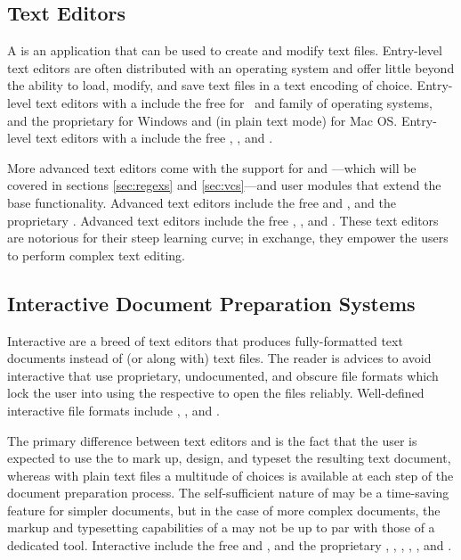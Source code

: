 \subsection{Text Editors}
A  is an application that can be used to create and modify
text files. Entry-level text editors are often distributed with an operating
system and offer little beyond the ability to load, modify, and save text files
in a text encoding of choice. Entry-level text editors with a 
include the free  for \Linux\ and  family of operating
systems, and the proprietary  for Windows and  (in
plain text mode) for Mac OS. Entry-level text editors with a 
include the free , 
, and .

More advanced text editors come with the support for 
and ---which will be covered in sections \ref{sec:regexs}
and \ref{sec:vcs}---and user modules that extend the base functionality.
Advanced  text editors include the free  and
, and the proprietary .  Advanced  text
editors include the free , , and . These
 text editors are notorious for their steep learning curve; in
exchange, they empower the users to perform complex text editing.

\subsection{Interactive Document Preparation Systems}
Interactive  are a breed of text
editors that produces fully-formatted text documents instead of (or along with)
text files. The reader is advices to avoid interactive  that use
proprietary, undocumented, and obscure file formats which lock the user into
using the respective  to open the files reliably. Well-defined
interactive  file formats include , ,
and .

The primary difference between text editors and  is the fact that
the user is expected to use the  to mark up, design, and typeset the
resulting text document, whereas with plain text files a multitude of choices is
available at each step of the document preparation process. The self-sufficient
nature of  may be a time-saving feature for simpler documents, but
in the case of more complex documents, the markup and typesetting capabilities
of a  may not be up to par with those of a dedicated tool.
Interactive  include the free  and
, and the proprietary , ,
, , , and
.

